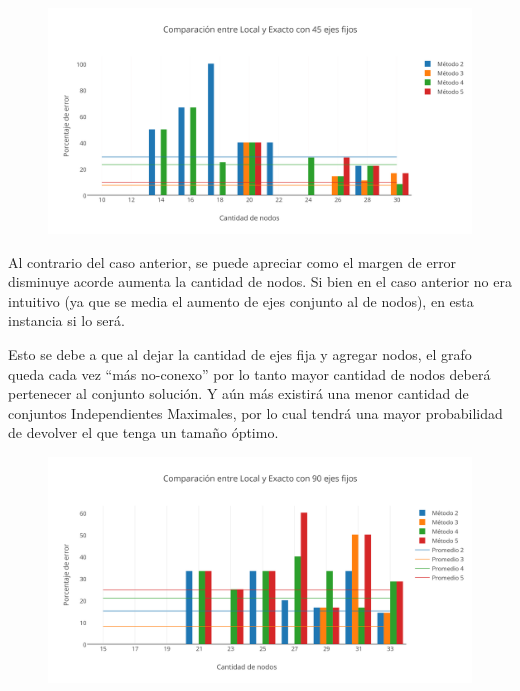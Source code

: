   \begin{figure}[h!]
   \begin{center}
 	\includegraphics[scale=0.7]{imagenes/local/exacto/45ejes.png}
   \end{center}
 \end{figure} 
 
 Al contrario del caso anterior, se puede apreciar como el margen de error disminuye acorde aumenta la cantidad de nodos. Si bien en el caso anterior no era intuitivo (ya que se media el aumento de ejes conjunto al de nodos), en esta instancia si lo será.
 
 Esto se debe a que al dejar la cantidad de ejes fija y agregar nodos, el grafo queda cada vez ``más no-conexo'' por lo tanto mayor cantidad de nodos deberá pertenecer al conjunto solución. Y aún más existirá una menor cantidad de conjuntos Independientes Maximales, por lo cual tendrá una mayor probabilidad de devolver el que tenga un tamaño óptimo.
 
  \begin{figure}[h!]
   \begin{center}
 	\includegraphics[scale=0.7]{imagenes/local/exacto/90ejes.png}
   \end{center}
 \end{figure} 
 
